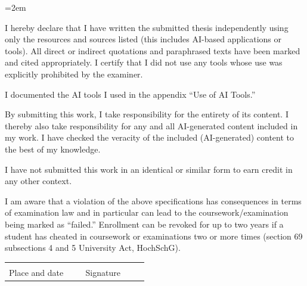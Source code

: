 \begingroup
\emergencystretch=2em

I hereby declare that I have written the submitted thesis independently using only the resources and sources listed (this includes AI-based applications or tools).
All direct or indirect quotations and paraphrased texts have been marked and cited appropriately.
I certify that I did not use any tools whose use was explicitly prohibited by the examiner.

I documented the AI tools I used in the appendix ``Use of AI Tools.''

By submitting this work, I take responsibility for the entirety of its content.
I thereby also take responsibility for any and all AI-generated content included in my work.
I have checked the veracity of the included (AI-generated) content to the best of my knowledge.

I have not submitted this work in an identical or similar form to earn credit in any other context.

I am aware that a violation of the above specifications has consequences in terms of examination law and in particular can lead to the coursework/examination being marked as ``failed.''
Enrollment can be revoked for up to two years if a student has cheated in coursework or examinations two or more times (section 69 subsections 4 and 5 University Act, HochSchG).

\vspace{2cm}

\noindent\begin{tabular}{@{}p{0.45\linewidth}@{}p{0.1\linewidth}@{}p{0.45\linewidth}@{}}
\hrulefill & & \hrulefill \\
\footnotesize{Place and date} & & \footnotesize{Signature}
\end{tabular}
\par\endgroup
